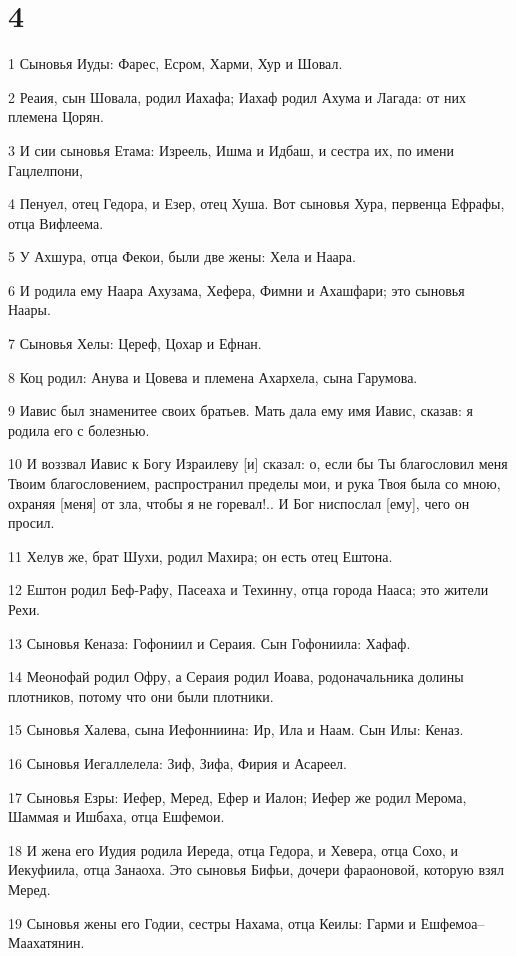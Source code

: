 \chapter{4}

\par 1 Сыновья Иуды: Фарес, Есром, Харми, Хур и Шовал.
\par 2 Реаия, сын Шовала, родил Иахафа; Иахаф родил Ахума и Лагада: от них племена Цорян.
\par 3 И сии сыновья Етама: Изреель, Ишма и Идбаш, и сестра их, по имени Гацлелпони,
\par 4 Пенуел, отец Гедора, и Езер, отец Хуша. Вот сыновья Хура, первенца Ефрафы, отца Вифлеема.
\par 5 У Ахшура, отца Фекои, были две жены: Хела и Наара.
\par 6 И родила ему Наара Ахузама, Хефера, Фимни и Ахашфари; это сыновья Наары.
\par 7 Сыновья Хелы: Цереф, Цохар и Ефнан.
\par 8 Коц родил: Анува и Цовева и племена Ахархела, сына Гарумова.
\par 9 Иавис был знаменитее своих братьев. Мать дала ему имя Иавис, сказав: я родила его с болезнью.
\par 10 И воззвал Иавис к Богу Израилеву [и] сказал: о, если бы Ты благословил меня Твоим благословением, распространил пределы мои, и рука Твоя была со мною, охраняя [меня] от зла, чтобы я не горевал!.. И Бог ниспослал [ему], чего он просил.
\par 11 Хелув же, брат Шухи, родил Махира; он есть отец Ештона.
\par 12 Ештон родил Беф-Рафу, Пасеаха и Техинну, отца города Нааса; это жители Рехи.
\par 13 Сыновья Кеназа: Гофониил и Сераия. Сын Гофониила: Хафаф.
\par 14 Меонофай родил Офру, а Сераия родил Иоава, родоначальника долины плотников, потому что они были плотники.
\par 15 Сыновья Халева, сына Иефонниина: Ир, Ила и Наам. Сын Илы: Кеназ.
\par 16 Сыновья Иегаллелела: Зиф, Зифа, Фирия и Асареел.
\par 17 Сыновья Езры: Иефер, Меред, Ефер и Иалон; Иефер же родил Мерома, Шаммая и Ишбаха, отца Ешфемои.
\par 18 И жена его Иудия родила Иереда, отца Гедора, и Хевера, отца Сохо, и Иекуфиила, отца Занаоха. Это сыновья Бифьи, дочери фараоновой, которую взял Меред.
\par 19 Сыновья жены его Годии, сестры Нахама, отца Кеилы: Гарми и Ешфемоа--Маахатянин.
